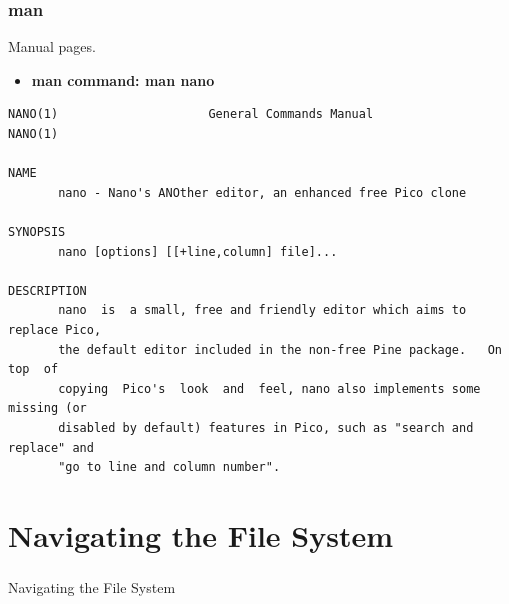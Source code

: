 \begin{frame}[fragile]
	\frametitle{ man}
        Manual pages. 
       
	\begin{itemize}
		\item \textbf{man command: man nano}
	\end{itemize}

{\tiny
	\begin{verbatim}
NANO(1)                     General Commands Manual                    NANO(1)

NAME
       nano - Nano's ANOther editor, an enhanced free Pico clone

SYNOPSIS
       nano [options] [[+line,column] file]...

DESCRIPTION
       nano  is  a small, free and friendly editor which aims to replace Pico,
       the default editor included in the non-free Pine package.   On  top  of
       copying  Pico's  look  and  feel, nano also implements some missing (or
       disabled by default) features in Pico, such as "search and replace" and
       "go to line and column number".
	\end{verbatim}
}
\end{frame}
\section{Navigating the File System}
\begin{frame}[fragile]
	\frametitle{}
\begin{center}
{\Huge
Navigating the File System
}
\end{center}

\end{frame}

